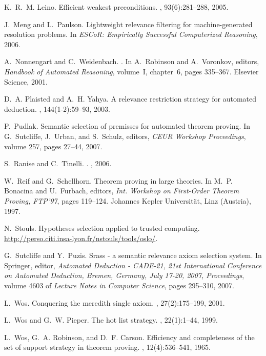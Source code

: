 \documentclass{acm_proc_article-sp}
\theoremstyle{nonumberplain}
\begin{document}
\begin{thebibliography}{10}
K.~R.~M. Leino.
\newblock Efficient weakest preconditions.
, 93(6):281--288, 2005.

J.~Meng and L.~Paulson.
\newblock Lightweight relevance filtering for machine-generated resolution
  problems.
\newblock In {\em ESCoR: Empirically Successful Computerized Reasoning}, 2006.

A.~Nonnengart and C.~Weidenbach.
.
\newblock In A.~Robinson and A.~Voronkov, editors, {\em Handbook of Automated
  Reasoning}, volume~I, chapter~6, pages 335--367. Elsevier Science, 2001.

D.~A. Plaisted and A.~H. Yahya.
\newblock A relevance restriction strategy for automated deduction.
, 144(1-2):59--93, 2003.

P.~Pudlak.
\newblock Semantic selection of premisses for automated theorem proving.
\newblock In G.~Sutcliffe, J.~Urban, and S.~Schulz, editors, {\em CEUR Workshop
  Proceedings}, volume 257, pages 27--44, 2007.

S.~Ranise and C.~Tinelli.
.
, 2006.

W.~Reif and G.~Schellhorn.
\newblock Theorem proving in large theories.
\newblock In M.~P. Bonacina and U.~Furbach, editors, {\em Int. Workshop on
  First-Order Theorem Proving, {FTP}'97}, pages 119--124. Johannes Kepler
  Universit{\"a}t, Linz (Austria), 1997.

N.~Stouls.
\newblock Hypotheses selection applied to trusted computing.
\newblock \url{http://perso.citi.insa-lyon.fr/nstouls/tools/oslo/}.

G.~Sutcliffe and Y.~Puzis.
\newblock Srass - a semantic relevance axiom selection system.
\newblock In Springer, editor, {\em Automated Deduction - CADE-21, 21st
  International Conference on Automated Deduction, Bremen, Germany, July 17-20,
  2007, Proceedings}, volume 4603 of {\em Lecture Notes in Computer Science},
  pages 295--310, 2007.

L.~Wos.
\newblock Conquering the meredith single axiom.
, 27(2):175--199, 2001.

L.~Wos and G.~W. Pieper.
\newblock The hot list strategy.
, 22(1):1--44, 1999.

L.~Wos, G.~A. Robinson, and D.~F. Carson.
\newblock Efficiency and completeness of the set of support strategy in theorem
  proving.
, 12(4):536--541, 1965.

\end{thebibliography}
\end{document}

